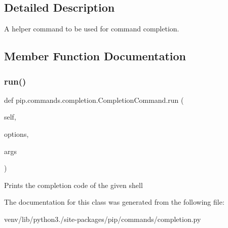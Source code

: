 \subsection{Detailed Description}
\begin{DoxyVerb}A helper command to be used for command completion.\end{DoxyVerb}
 

\subsection{Member Function Documentation}
\mbox{\label{classpip_1_1commands_1_1completion_1_1_completion_command_ad190206296de237e2e75dba8b8efacd1}} 
\subsubsection{\texorpdfstring{run()}{run()}}
{\footnotesize\ttfamily def pip.\+commands.\+completion.\+Completion\+Command.\+run (\begin{DoxyParamCaption}\item[{}]{self,  }\item[{}]{options,  }\item[{}]{args }\end{DoxyParamCaption})}

\begin{DoxyVerb}Prints the completion code of the given shell\end{DoxyVerb}
 

The documentation for this class was generated from the following file\+:\begin{DoxyCompactItemize}
\item 
venv/lib/python3./site-\/packages/pip/commands/completion.\+py\end{DoxyCompactItemize}
